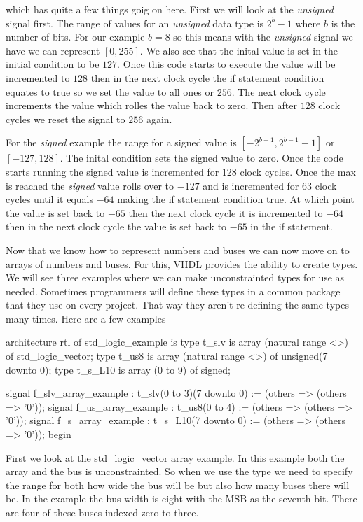 which has quite a few things goig on here. First we will look at the \emph{unsigned} signal first. The range of values for an \emph{unsigned}	data type is $2^b-1$ where $b$ is the number of bits. For our example $b=8$ so this means with the \emph{unsigned} signal we have we can represent $[0,255]$. We also see that the inital value is set in the initial condition to be $127$. Once this code starts to execute the value will be incremented to $128$ then in the next clock cycle the if statement condition equates to true so we set the value to all ones or $256$. The next clock cycle increments the value which rolles the value back to zero. Then after $128$ clock cycles we reset the signal to $256$ again. 

For the \emph{signed} example the range for a signed value is $[-2^{b-1},2^{b-1}-1]$ or $[-127,128]$. The inital condition sets the signed value to zero. Once the code starts running the signed value is incremented for 128 clock cycles. Once the max is reached the \emph{signed} value rolls over to $-127$ and is incremented for $63$ clock cycles until it equals $-64$ making the if statement condition true. At which point the value is set back to $-65$ then the next clock cycle it is incremented to $-64$ then in the next clock cycle the value is set back to $-65$ in the if statement. 

Now that we know how to represent numbers and buses we can now move on to arrays of numbers and buses. For this, \ac{VHDL} provides the ability to create types. We will see three examples where we can make unconstrainted types for use as needed. Sometimes programmers will define these types in a common package that they use on every project. That way they aren't re-defining the same types many times. Here are a few examples

\begin{VHDLlisting}[tabsize=4]
architecture rtl of std_logic_example is
	type t_slv is array (natural range <>) of std_logic_vector;
	type t_us8 is array (natural range <>) of unsigned(7 downto 0);
	type t_s_L10 is array (0 to 9) of signed;

	signal f_slv_array_example : t_slv(0 to 3)(7 downto 0) := (others => (others => '0'));
	signal f_us_array_example  : t_us8(0 to 4)             := (others => (others => '0'));
	signal f_s_array_example   : t_s_L10(7 downto 0)       := (others => (others => '0'));
begin
\end{VHDLlisting}

First we look at the std\_logic\_vector array example. In this example both the array and the bus is unconstrainted. So when we use the type we need to specify the range for both how wide the bus will be but also how many buses there will be. In the example the bus width is eight with the \ac{MSB} as the seventh bit. There are four of these buses indexed zero to three. 

